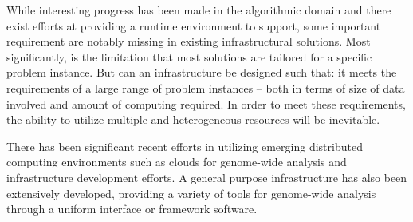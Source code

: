\documentclass{cpeauth}
\begin{document}








While interesting progress has been made in the algorithmic domain and
there exist efforts at providing a runtime environment to support,
some important requirement are notably missing in existing
infrastructural solutions. Most significantly, is the limitation that
most solutions are tailored for a specific problem instance. But can
an infrastructure be designed such that: it meets the requirements of
a large range of problem instances -- both in terms of size of data
involved and amount of computing required.  In order to meet these
requirements, the ability to utilize multiple and heterogeneous
resources will be inevitable.

There has been significant recent efforts in utilizing emerging
distributed computing environments such as clouds for genome-wide
analysis and infrastructure development
efforts\cite{taylor2010,cloudburst, cloudblast, langmead2009,
  langmead2010,gatk, halligan2009,luyf-2010}.
A general purpose infrastructure has also been extensively developed,
providing a variety of tools for genome-wide analysis through a
uniform interface or framework software\cite{galaxy}.
\end{document}
